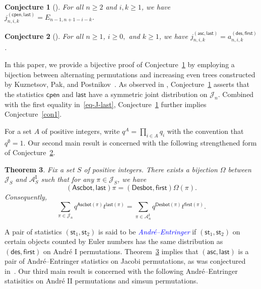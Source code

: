 \documentclass[12pt]{article}
\def\blue{\textcolor{blue}}
\def\blue{\textcolor{blue}}
\numberwithin{equation}{section}
\def\blue{\textcolor{blue}}
\def\blue{\textcolor{blue}}
\theoremstyle{plain}
\newtheorem{theorem}{Theorem}[section]
\newtheorem{conjecture}[theorem]{Conjecture}
\def\des{\mathsf{des}}
\def\st{\mathsf{st}}
\def\asc{\mathsf{asc}}
\def\Ascbot{\mathsf{Ascbot}}
\def\Desbot{\mathsf{Desbot}}
\def\cpen{\mathsf{cpen}}
\def\first{\mathsf{first}}
\def\last{\mathsf{last}}
\begin{document}
   
    \begin{conjecture}[]\label{con2}
     For all $n \ge 2$ and $i,k \ge 1$, we have $j^{(\cpen, \last)}_{n,i, k} = E_{n-1, n+1-i-k}$.
   \end{conjecture}
   
   
    \begin{conjecture}[]\label{con3} For all $n \ge 1$, $i\geq 0,$ and $k \ge 1$, we have $j^{(\asc, \last)}_{n,i, k} = a^{(\des, \first)}_{n,i,k}$.
   \end{conjecture}
   
   In this paper, we provide a bijective proof of Conjecture~\ref{con2} by  employing a  bijection between  alternating permutations and increasing even trees constructed by Kuznetsov, Pak, and Postnikov~\cite{KPP}. 
  As observed in \cite{HHSSY25},  Conjecture~\ref{con2} asserts that  the statistics $\cpen$ and $\last$ have  a symmetric joint distribution on $\mathcal{J}_n$. Combined with the first equality in~\eqref{eq-J-last}, Conjecture~\ref{con2} further implies Conjecture~\ref{con1}.
  
  For a set $A$ of positive integers, write $q^{A}=\prod_{i\in A}q_i$ with the convention that $q^{\emptyset}=1$. 
  Our second  main result is concerned with the following strengthened form  of Conjecture~\ref{con3}.
  \begin{theorem}\label{thm-main}
  		Fix a  set $S$ of positive integers.  There exists a bijection  $\Omega$  between $\mathcal{J}_S$ and $\mathcal{A}^{\mathrm{I}}_S$  such that for any 
  		$\pi\in \mathcal{J}_S$, we have
  		\begin{equation}\label{eq-omega}
  			(\Ascbot,   \last)\pi= (\Desbot,   \first)\Omega(\pi).
  			\end{equation}
  		Consequently, 
  		\begin{equation}\label{eq-Omega}
  			\sum\limits_{\pi\in \mathcal{J}_n}q^{\Ascbot(\pi)}t^{\last(\pi)}=\sum\limits_{\pi\in \mathcal{A}^{\mathrm{I}}_n}q^{\Desbot(\pi)} t^{\first(\pi)}.
  			\end{equation}
  	\end{theorem}
  
  
   
  	
  	
   A pair of statistics $(\st_1, \st_2)$   is said to be \blue{\em André–Entringer} if $(\st_1, \st_2)$ on certain objects counted by Euler numbers has the same distribution as $(\des, \first)$ on Andr\'e I permutations. Theorem~\ref{thm-main} implies that $(\asc,\last)$ is a pair of André–Entringer statistics on Jacobi permutations, as was conjectured in~\cite{HHSSY25}. 
  	Our third main result is concerned with the following  André–Entringer statisitics on Andr\'e II permutations and simsun permutations.
   
\end{document}
